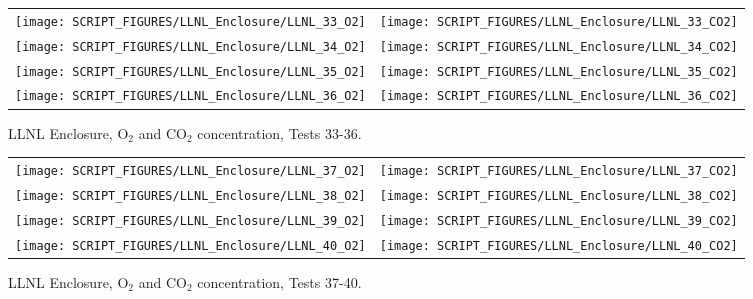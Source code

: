 \begin{figure}[p]
\begin{tabular*}{\textwidth}{l@{\extracolsep{\fill}}r}
\texttt{[image: SCRIPT\_FIGURES/LLNL\_Enclosure/LLNL\_33\_O2]} &
\texttt{[image: SCRIPT\_FIGURES/LLNL\_Enclosure/LLNL\_33\_CO2]} \\
\texttt{[image: SCRIPT\_FIGURES/LLNL\_Enclosure/LLNL\_34\_O2]} &
\texttt{[image: SCRIPT\_FIGURES/LLNL\_Enclosure/LLNL\_34\_CO2]} \\
\texttt{[image: SCRIPT\_FIGURES/LLNL\_Enclosure/LLNL\_35\_O2]} &
\texttt{[image: SCRIPT\_FIGURES/LLNL\_Enclosure/LLNL\_35\_CO2]} \\
\texttt{[image: SCRIPT\_FIGURES/LLNL\_Enclosure/LLNL\_36\_O2]} &
\texttt{[image: SCRIPT\_FIGURES/LLNL\_Enclosure/LLNL\_36\_CO2]}
\end{tabular*}
\caption[LLNL Enclosure, O$_2$ and CO$_2$ concentration, Tests 33-36]{LLNL Enclosure, O$_2$ and CO$_2$ concentration, Tests 33-36.}
\label{LLNL_Gas_9}
\end{figure}

\begin{figure}[p]
\begin{tabular*}{\textwidth}{l@{\extracolsep{\fill}}r}
\texttt{[image: SCRIPT\_FIGURES/LLNL\_Enclosure/LLNL\_37\_O2]} &
\texttt{[image: SCRIPT\_FIGURES/LLNL\_Enclosure/LLNL\_37\_CO2]} \\
\texttt{[image: SCRIPT\_FIGURES/LLNL\_Enclosure/LLNL\_38\_O2]} &
\texttt{[image: SCRIPT\_FIGURES/LLNL\_Enclosure/LLNL\_38\_CO2]} \\
\texttt{[image: SCRIPT\_FIGURES/LLNL\_Enclosure/LLNL\_39\_O2]} &
\texttt{[image: SCRIPT\_FIGURES/LLNL\_Enclosure/LLNL\_39\_CO2]} \\
\texttt{[image: SCRIPT\_FIGURES/LLNL\_Enclosure/LLNL\_40\_O2]} &
\texttt{[image: SCRIPT\_FIGURES/LLNL\_Enclosure/LLNL\_40\_CO2]}
\end{tabular*}
\caption[LLNL Enclosure, O$_2$ and CO$_2$ concentration, Tests 37-40]{LLNL Enclosure, O$_2$ and CO$_2$ concentration, Tests 37-40.}
\label{LLNL_Gas_10}
\end{figure}

